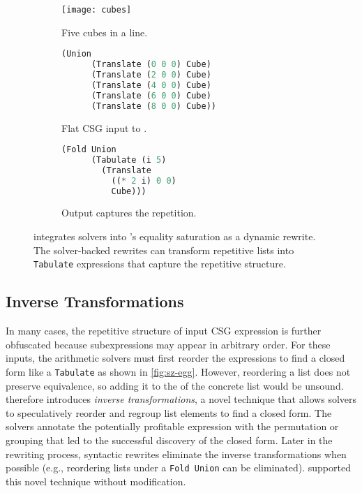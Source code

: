 \begin{figure}
\begin{subfigure}[b]{0.3\linewidth}
  \texttt{[image: cubes]}
  \caption{Five cubes in a line.}
\end{subfigure}
\hfill
\begin{subfigure}[b]{0.3\linewidth}
  \begin{lstlisting}[language=Rust, gobble=4, basicstyle=\footnotesize\ttfamily]
    (Union
      (Translate (0 0 0) Cube)
      (Translate (2 0 0) Cube)
      (Translate (4 0 0) Cube)
      (Translate (6 0 0) Cube)
      (Translate (8 0 0) Cube))
  \end{lstlisting}
  \caption{Flat CSG input to \sz.}
  \label{fig:sz-egg-input}
\end{subfigure}
\hfill
\begin{subfigure}[b]{0.35\linewidth}
  \begin{lstlisting}[language=Rust, gobble=4, basicstyle=\footnotesize\ttfamily, showlines=true, xleftmargin=5mm]
    (Fold Union
      (Tabulate (i 5)
        (Translate
          ((* 2 i) 0 0)
          Cube)))

  \end{lstlisting}
  \caption{Output captures the repetition.}
  \label{fig:sz-egg-output}
\end{subfigure}
  \caption{
    \sz integrates solvers into \egg's equality saturation as a dynamic rewrite.
    The solver-backed rewrites can transform repetitive lists into
    \texttt{Tabulate} expressions that capture the repetitive structure.
  }
  \label{fig:sz-egg}
\end{figure}

\subsection{Inverse Transformations}

In many cases, the repetitive structure of input CSG expression is further
  obfuscated because subexpressions may appear in arbitrary order.
For these inputs, the arithmetic solvers must first reorder
  the expressions to find a closed form like a \texttt{Tabulate}
  as shown in \autoref{fig:sz-egg}.
However, reordering a list does not preserve equivalence, so adding it to the
  \eclass of the concrete list would be unsound.
\sz therefore introduces \textit{inverse transformations},
  a novel technique that allows solvers to speculatively reorder and regroup list
  elements to find a closed form.
The solvers annotate the potentially profitable expression with the
  permutation or grouping that led to the successful discovery
  of the closed form.
Later in the rewriting process, syntactic rewrites eliminate the inverse
  transformations when possible
  (e.g., reordering lists under a \texttt{Fold Union} can be eliminated).
\egg supported this novel technique without modification.

